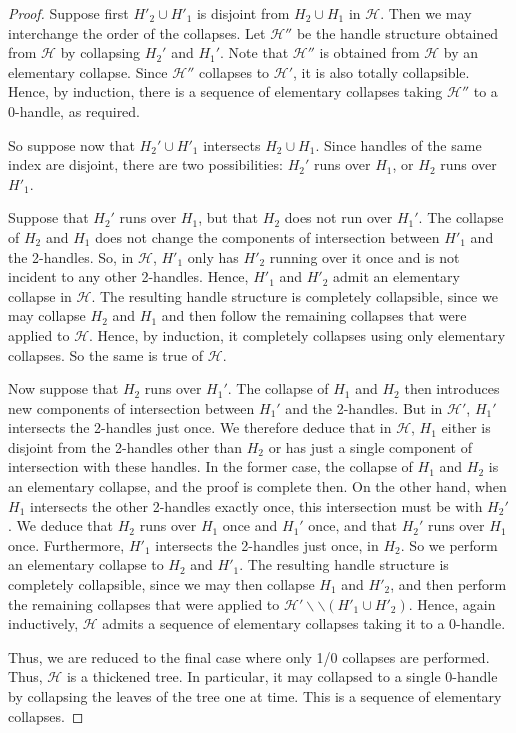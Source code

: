 \documentclass[oneside]{amsart}
\numberwithin{equation}{section}
\theoremstyle{plain}
\theoremstyle{definition}
\newcommand{\cut}{\backslash\backslash}
\newcommand{\calH}{\mathcal{H}}
\begin{document}
\begin{proof}
Suppose first $H'_2 \cup H'_1$ is disjoint from $H_2 \cup H_1$ in $\calH$. Then we may interchange the order
of the collapses. Let $\calH''$ be the handle structure obtained from $\calH$ by collapsing
$H_2'$ and $H_1'$. Note that $\calH''$ is obtained from $\calH$ by an elementary collapse.
Since $\calH''$ collapses to $\calH'$, it is also totally collapsible. Hence, by induction,
there is a sequence of elementary collapses taking $\calH''$ to a 0-handle, as required.

So suppose now that $H_2' \cup H'_1$ intersects $H_2 \cup H_1$. Since handles of the same
index are disjoint, there are two possibilities: $H_2'$ runs over $H_1$, or $H_2$ runs over $H'_1$.

Suppose that $H_2'$ runs over $H_1$, but that $H_2$ does not run over $H_1'$. The collapse of $H_2$
and $H_1$ does not change the components of intersection between $H'_1$ and the 2-handles.
So, in $\calH$, $H'_1$ only has $H'_2$ running over it once and is not incident to any other 2-handles.
Hence, $H'_1$ and $H'_2$ admit an elementary collapse in $\calH$. The resulting handle structure is
completely collapsible, since we may collapse $H_2$ and $H_1$ and then follow the remaining collapses that
were applied to $\calH$. Hence, by induction, it completely collapses
using only elementary collapses. So the same is true of $\calH$.

Now suppose that $H_2$ runs over $H_1'$. The collapse of $H_1$ and $H_2$ then introduces
new components of intersection between $H_1'$ and the 2-handles. But in $\calH'$, $H_1'$ intersects
the 2-handles just once. We therefore deduce that in $\calH$, $H_1$ either is disjoint from 
the 2-handles other than $H_2$ or has just a single component of intersection with these handles.
In the former case, the collapse of $H_1$ and $H_2$ is an elementary collapse, and the
proof is complete then. On the other hand, when $H_1$ intersects the other 2-handles exactly once,
this intersection must be with $H_2'$. We deduce that $H_2$ runs over $H_1$ once and $H_1'$ once,
and that $H_2'$ runs over $H_1$ once. Furthermore, $H'_1$ intersects the 2-handles just once,
in $H_2$. So we perform an elementary collapse to $H_2$ and $H'_1$. The resulting handle structure
is completely collapsible, since we may then collapse $H_1$ and $H'_2$, and then perform the
remaining collapses that were applied to $\calH' \cut (H'_1 \cup H'_2)$. Hence, again inductively,
$\calH$ admits a sequence of elementary collapses taking it to a 0-handle.

Thus, we are reduced to the final case where only 1/0 collapses are performed. Thus,
$\calH$ is a thickened tree. In particular, it may collapsed to a single 0-handle by collapsing
the leaves of the tree one at time. This is a sequence of elementary collapses.
\end{proof}
\end{document}
